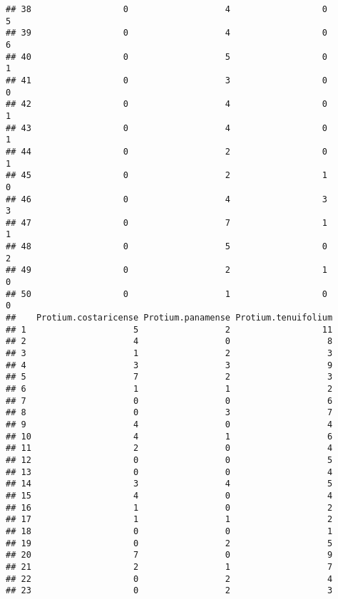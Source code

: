 \documentclass[
]{article}
\begin{document}
\begin{verbatim}
## 38                  0                   4                  0                 5
## 39                  0                   4                  0                 6
## 40                  0                   5                  0                 1
## 41                  0                   3                  0                 0
## 42                  0                   4                  0                 1
## 43                  0                   4                  0                 1
## 44                  0                   2                  0                 1
## 45                  0                   2                  1                 0
## 46                  0                   4                  3                 3
## 47                  0                   7                  1                 1
## 48                  0                   5                  0                 2
## 49                  0                   2                  1                 0
## 50                  0                   1                  0                 0
##    Protium.costaricense Protium.panamense Protium.tenuifolium
## 1                     5                 2                  11
## 2                     4                 0                   8
## 3                     1                 2                   3
## 4                     3                 3                   9
## 5                     7                 2                   3
## 6                     1                 1                   2
## 7                     0                 0                   6
## 8                     0                 3                   7
## 9                     4                 0                   4
## 10                    4                 1                   6
## 11                    2                 0                   4
## 12                    0                 0                   5
## 13                    0                 0                   4
## 14                    3                 4                   5
## 15                    4                 0                   4
## 16                    1                 0                   2
## 17                    1                 1                   2
## 18                    0                 0                   1
## 19                    0                 2                   5
## 20                    7                 0                   9
## 21                    2                 1                   7
## 22                    0                 2                   4
## 23                    0                 2                   3

\end{verbatim}
\end{document}
